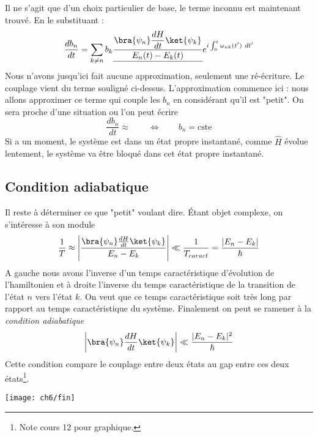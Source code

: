 Il ne s'agit que d'un choix particulier de base, le terme inconnu est maintenant trouvé. En le 
substituant :
\begin{equation}
\frac{db_n}{dt} = \sum_{k\neq n} b_k \underline{\dfrac{\bra{\psi_n}\dfrac{dH}{dt}\ket{\psi_k}}{E_n(t)-E_k(t)}}
e^{i\int_0^t \omega_{nk}(t')\ dt'}
\end{equation}
Nous n'avons jusqu'ici fait aucune approximation, seulement une ré-écriture. Le couplage 
vient du terme souligné ci-dessus. L'approximation commence ici : nous allons approximer ce 
terme qui couple les $b_n$ en considérant qu'il est "petit". On sera proche d'une situation 
ou l'on peut écrire
\begin{equation}
\dfrac{db_n}{dt}\approx\qquad\Leftrightarrow\qquad b_n = \text{cste}
\end{equation}
Si a un moment, le système est dans un état propre instantané, comme $\hat{H}$ évolue lentement, 
le système va être bloqué dans cet état propre instantané.


	\subsection{Condition adiabatique}
	Il reste à déterminer ce que "petit" voulant dire. Étant objet complexe, on s'intéresse à son module
	\begin{equation}
	\frac{1}{T}\approx\left|\dfrac{\bra{\psi_n}\frac{dH}{dt}\ket{\psi_k}}{E_n-E_k}\right| \ll \dfrac{1}{
	T_{caract}} = \dfrac{|E_n-E_k|}{\hbar}
	\end{equation}
	A gauche nous avons l'inverse d'un temps caractéristique d'évolution de l'hamiltonien et à droite 
	l'inverse du temps caractéristique de la transition de l'état $n$ vers l'état $k$. On veut que ce 
	temps caractéristique soit très long par rapport au temps caractéristique	du système. Finalement 
	on peut se ramener à la \textit{condition adiabatique}
	\begin{equation}
	\left|\bra{\psi_n}\frac{dH}{dt}\ket{\psi_k}\right| \ll \dfrac{|E_n-E_k|^2}{\hbar}
	\end{equation}
	Cette condition compare le couplage entre deux états au gap entre ces deux états\footnote{Note cours 12
	pour graphique.}. 
	
	
	
	
	\vspace{1cm}
	\begin{center}
	\texttt{[image: ch6/fin]}
	\end{center}				